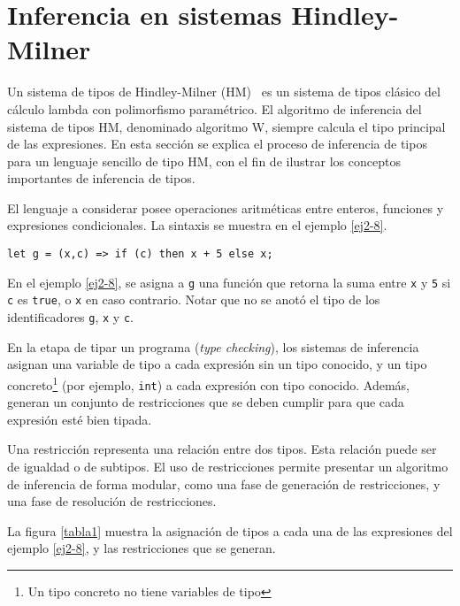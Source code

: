 \section{Inferencia en sistemas Hindley-Milner}

Un sistema de tipos de Hindley-Milner (HM)~\cite{damasmilner} es un sistema de tipos clásico del cálculo lambda con polimorfismo paramétrico. El algoritmo de inferencia del sistema de tipos HM, denominado algoritmo W, siempre calcula el tipo principal de las expresiones. En esta sección se explica el proceso de inferencia de tipos para un lenguaje sencillo de tipo HM, con el fin de ilustrar los conceptos importantes de inferencia de tipos.

El lenguaje a considerar posee operaciones aritméticas entre enteros, funciones y expresiones condicionales. La sintaxis se muestra en el ejemplo \ref{ej2-8}.

\vspace{0.8em}
\begin{ej}
  \normalfont
  \label{ej2-8}
\begin{lstlisting}[morekeywords={then}]
  let g = (x,c) => if (c) then x + 5 else x;
\end{lstlisting}
\end{ej}

En el ejemplo \ref{ej2-8}, se asigna a \texttt{g} una función que retorna la suma entre \texttt{x} y \texttt{5} si \texttt{c} es \texttt{true}, o \texttt{x} en caso contrario. Notar que no se anotó el tipo de los identificadores \texttt{g}, \texttt{x} y \texttt{c}.

En la etapa de tipar un programa (\emph{type checking}), los sistemas de inferencia asignan una variable de tipo a cada expresión sin un tipo conocido, y un tipo concreto\footnote{Un tipo concreto no tiene variables de tipo} (por ejemplo, \texttt{int}) a cada expresión con tipo conocido. Además, generan un conjunto de restricciones que se deben cumplir para que cada expresión esté bien tipada.

Una restricción representa una relación entre dos tipos. Esta relación puede ser de igualdad o de subtipos. El uso de restricciones permite presentar un algoritmo de inferencia de forma modular, como una fase de generación de restricciones, y una fase de resolución de restricciones.

La figura \ref{tabla1} muestra la asignación de tipos a cada una de las expresiones del ejemplo \ref{ej2-8}, y las restricciones que se generan.


